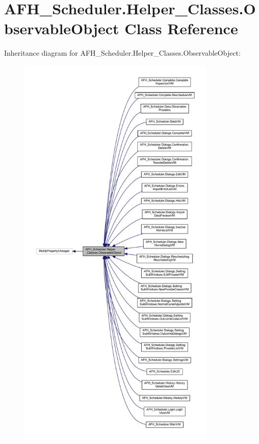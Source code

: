 \section{A\+F\+H\+\_\+\+Scheduler.\+Helper\+\_\+\+Classes.\+Observable\+Object Class Reference}
\label{class_a_f_h___scheduler_1_1_helper___classes_1_1_observable_object}


Inheritance diagram for A\+F\+H\+\_\+\+Scheduler.\+Helper\+\_\+\+Classes.\+Observable\+Object\+:
\nopagebreak
\begin{figure}[H]
\begin{center}
\leavevmode
\includegraphics[height=550pt]{class_a_f_h___scheduler_1_1_helper___classes_1_1_observable_object__inherit__graph}
\end{center}
\end{figure}


